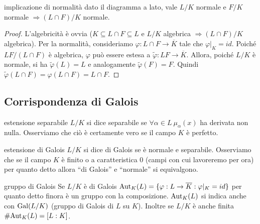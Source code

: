 \begin{minipage}{0.65\textwidth}
\begin{theorem}{implicazione di normalità}
    dato il diagramma a lato, vale $L/K$ normale e $F/K$ normale $\Rightarrow (L\cap F)/K$ normale.
\end{theorem}
\begin{proof}
    L'algebricità è ovvia ($K \subseteq L \cap F \subseteq L$ e $L/K$ algebrica $\Rightarrow (L\cap F)/K$ algebrica). Per la normalità, consideriamo $\varphi: L\cap F\rightarrow \overline{K}$ tale che $\varphi|_K = id$. Poiché $LF/(L\cap F)$ è algebrica, $\varphi$ può essere estesa a $\tilde \varphi : LF \rightarrow \overline{K}$. Allora, poiché $L/K$ è normale, si ha $\tilde \varphi(L)  = L$ e analogamente $\tilde \varphi(F) = F$. Quindi $\tilde \varphi(L\cap F)  = \varphi(L\cap F) = L\cap F$.
\end{proof}
\end{minipage}\hfill
\begin{minipage}{0.35\textwidth}  
\end{minipage}\hfill

\subsection{Corrispondenza di Galois}
\begin{definition}{estensione separabile}
    $L/K$ si dice separabile se $\forall \alpha \in L \ \mu_{\alpha}(x)$ ha derivata non nulla. Osserviamo che ciò è certamente vero se il campo $K$ è perfetto.
\end{definition}

\begin{definition}{estensione di Galois}
    $L/K$ si dice di Galois se è normale e separabile. Osserviamo che se il campo $K$ è finito o a caratteristica 0 (campi con cui lavoreremo per ora) per quanto detto allora ``di Galois'' e ``normale'' si equivalgono.
\end{definition}
\begin{definition}{gruppo di Galois}
    Se $L/K$ è di Galois $\text{Aut}_K(L) = \{\varphi : L \rightarrow \overline K : \varphi|_K = id\}$ per quanto detto finora è un gruppo con la composizione. $\text{Aut}_K(L)$ si indica anche con $\text{Gal}(L/K)$ (gruppo di Galois di $L$ su $K$). Inoltre se $L/K$ è anche finita $\#\text{Aut}_K(L) = [L:K]$.
\end{definition}

